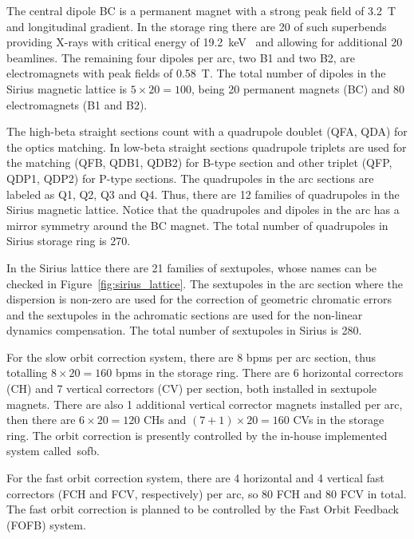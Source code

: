 The central dipole BC is a permanent magnet with a strong peak field of \SI{3.2}{\tesla} and longitudinal gradient. In the storage ring there are 20 of such superbends providing X-rays with critical energy of \SI{19.2}{\kilo\electronvolt}~\cite{Liu2016b} and allowing for additional 20 beamlines. The remaining four dipoles per arc, two B1 and two B2, are electromagnets with peak fields of \SI{0.58}{\tesla}. The total number of dipoles in the Sirius magnetic lattice is $5 \times 20 = 100$, being 20 permanent magnets (BC) and 80 electromagnets (B1 and B2).

The high-beta straight sections count with a quadrupole doublet (QFA, QDA) for the optics matching. In low-beta straight sections quadrupole triplets are used for the matching (QFB, QDB1, QDB2) for B-type section and other triplet (QFP, QDP1, QDP2) for P-type sections. The quadrupoles in the arc sections are labeled as Q1, Q2, Q3 and Q4. Thus, there are 12 families of quadrupoles in the Sirius magnetic lattice. Notice that the quadrupoles and dipoles in the arc has a mirror symmetry around the BC magnet. The total number of quadrupoles in Sirius storage ring is 270. 

In the Sirius lattice there are 21 families of sextupoles, whose names can be checked in Figure~\ref{fig:sirius_lattice}. The sextupoles in the arc section where the dispersion is non-zero are used for the correction of geometric chromatic errors and the sextupoles in the achromatic sections are used for the non-linear dynamics compensation. The total number of sextupoles in Sirius is 280.

For the slow orbit correction system, there are 8 \glspl{bpm} per arc section, thus totalling $8 \times 20 = 160$ \glspl{bpm} in the storage ring. There are 6 horizontal correctors (CH) and 7 vertical correctors (CV) per section, both installed in sextupole magnets. There are also 1 additional vertical corrector magnets installed per arc, then there are $6 \times 20 = 120$ CHs and $(7 + 1) \times 20 = 160$ CVs in the storage ring. The orbit correction is presently controlled by the in-house implemented system called~\gls{sofb}.

For the fast orbit correction system, there are 4 horizontal and 4 vertical fast correctors (FCH and FCV, respectively) per arc, so 80 FCH and 80 FCV in total. The fast orbit correction is planned to be controlled by the Fast Orbit Feedback (FOFB) system.

